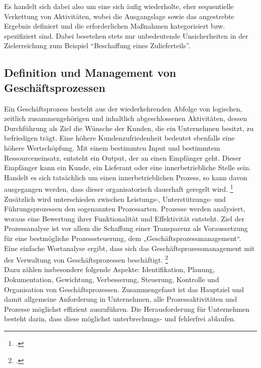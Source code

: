 Es handelt sich dabei also um eine sich äufig wiederholte, eher sequentielle
Verkettung von Aktivitäten, wobei die Ausgangslage sowie das
angestrebte Ergebnis definiert und die erforderlichen Maßnahmen
kategorisiert bzw. spezifiziert sind. Dabei besetehen stets nur
unbedeutende Unsicherheiten in der Zielerreichung zum Beispiel "`Beschaffung
eines Zulieferteils"'.

\subsection{Definition und Management von Geschäftsprozessen}


Ein Geschäftsprozess besteht aus der wiederkehrenden Abfolge von logischen,
zeitlich zusammengehörigen und inhaltlich abgeschlossenen Aktivitäten, dessen 
Durchführung als Ziel die Wünsche der Kunden, die ein Unternehmen besitzt, zu befriedigen trägt.
Eine höhere Kundenzufriedenheit bedeutet ebenfalls eine höhere Wertschöpfung. 
Mit einem bestimmten Input und bestimmtem Ressourceneinsatz, 
entsteht ein Output, der an einen Empfänger geht. 
Dieser Empfänger kann ein Kunde, ein Lieferant oder eine innerbetriebliche Stelle sein. 
Handelt es sich tatsächlich um einen innerbetrieblichen Prozess, 
so kann davon ausgegangen werden, dass dieser organisatorisch dauerhaft geregelt wird.
\footcite[Vgl.][ ]{prozess:db}\\



Zusätzlich wird unterschieden zwischen Leistungs-, Unterstützungs- und
Führungsprozessen den sogenannten Prozessarten. Prozesse werden analysiert, 
woraus eine Bewertung ihrer Funktionalität und Effektivität entsteht. 
Ziel der Prozessanalyse ist vor allem die Schaffung einer Transparenz als 
Voraussetzung für eine bestmögliche Prozesssteuerung, dem „Geschäftsprozessmanagement“. 
Eine einfache Wortanalyse ergibt, dass sich das Geschäftsprozessmanagement 
mit der Verwaltung von Geschäftsprozessen beschäftigt.
\footcite[S.13]{lehmann}\\

Dazu zählen insbesondere folgende Aspekte:
Identifikation, Planung, Dokumentation,  Gewichtung, Verbesserung,
Steuerung, Kontrolle und Organisation von Geschäftsprozessen.
Zusammengefasst ist das Hauptziel und damit allgemeine Anforderung in Unternehmen, 
alle Prozessaktivitäten und Prozesse möglichst effizient auszuführen. 
Die Herausforderung für Unternehmen besteht darin, dass diese 
möglichst unterbrechungs- und fehlerfrei ablaufen.\\

